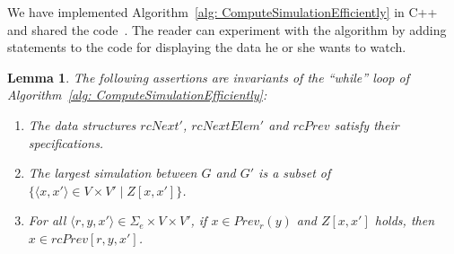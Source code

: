 \documentclass[11pt]{article}
\def\tuple#1{\langle#1\rangle}
\newcommand{\SE}{\Sigma_e}
\newcommand{\Prev}{\mathit{Prev}}
\newcommand{\rcNextP}{\mathit{rcNext}'}
\newcommand{\rcPrev}{\mathit{rcPrev}}
\newcommand{\rcNextElemP}{\mathit{rcNextElem}'}
\newtheorem{lemma}[theorem]{Lemma}
\begin{document}
We have implemented Algorithm~\ref{alg: ComputeSimulationEfficiently} in C++ and shared the code~\cite{compCSfFS-impl}. The reader can experiment with the algorithm by adding statements to the code for displaying the data he or she wants to watch.


\begin{lemma}\label{lemma: JHDKA 2}
The following assertions are invariants of the ``while'' loop of Algorithm~\ref{alg: ComputeSimulationEfficiently}: 
\begin{enumerate}
\item The data structures $\rcNextP$, $\rcNextElemP$ and $\rcPrev$ satisfy their specifications. 
\item The largest simulation between $G$ and $G'$ is a subset of $\{\tuple{x,x'} \in V \times V' \mid Z[x,x']\}$.
\item For all $\tuple{r,y,x'} \in \SE \times V \times V'$, if $x \in \Prev_r(y)$ and $Z[x,x']$ holds, then $x \in \rcPrev[r,y,x']$. 
\end{enumerate}
\end{lemma}
\end{document}
